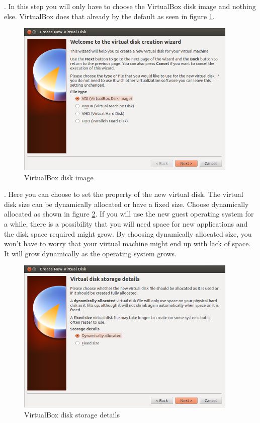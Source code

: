 \newpage
\par {}. In this step you will only have to choose the VirtualBox disk image and nothing else. VirtualBox does that already by the default as seen in figure \ref{fig:wizard-VDI}. \\

\begin{figure}[!h]	
	\centering
	\includegraphics[width=300pt]{./images/installation/virtualbox/wizard-VDI.png}
	\caption{VirtualBox disk image}	
	\label{fig:wizard-VDI}	
\end{figure}

\par {}. Here you can choose to set the property of the new virtual disk. The virtual disk size can be dynamically allocated  or have a fixed size. Choose dynamically allocated as shown in figure \ref{fig:wizard-dynamicsize}. If you will use the new guest operating system for a while, there is a possibility that you will need space for new applications and the disk space required might grow. By choosing dynamically allocated size, you won't have to worry that your virtual machine might end up with lack of space. It will grow dynamically as the operating system grows. \\

\begin{figure}[!h]	
	\centering
	\includegraphics[width=300pt]{./images/installation/virtualbox/wizard-dynamicsize.png}
	\caption{VirtualBox disk storage details}	
	\label{fig:wizard-dynamicsize}	
\end{figure}

